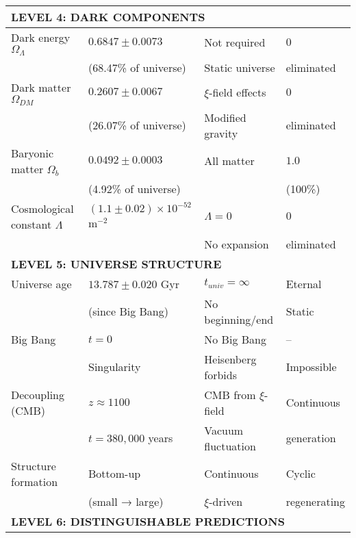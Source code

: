 \documentclass[12pt,a4paper]{article}
\begin{document}
\begin{longtable}{p{5cm}p{4cm}p{3.5cm}p{3.5cm}}
	\midrule
	\multicolumn{4}{l}{\textbf{LEVEL 4: DARK COMPONENTS}} \\
	\midrule
	
	Dark energy $\Omega_\Lambda$ & $0.6847 \pm 0.0073$ & Not required & $0$ \\
	& (68.47\% of universe) & Static universe & eliminated \\[0.3em]
	
	Dark matter $\Omega_{DM}$ & $0.2607 \pm 0.0067$ & $\xi$-field effects & $0$ \\
	& (26.07\% of universe) & Modified gravity & eliminated \\[0.3em]
	
	Baryonic matter $\Omega_b$ & $0.0492 \pm 0.0003$ & All matter & $1.0$ \\
	& (4.92\% of universe) & & (100\%) \\[0.3em]
	
	Cosmological constant $\Lambda$ & $(1.1 \pm 0.02) \times 10^{-52}$ m$^{-2}$ & $\Lambda = 0$ & $0$ \\
	& & No expansion & eliminated \\[0.3em]
	
	\midrule
	\multicolumn{4}{l}{\textbf{LEVEL 5: UNIVERSE STRUCTURE}} \\
	\midrule
	
	Universe age & $13.787 \pm 0.020$ Gyr & $t_{univ} = \infty$ & Eternal \\
	& (since Big Bang) & No beginning/end & Static \\[0.3em]
	
	Big Bang & $t = 0$ & No Big Bang & -- \\
	& Singularity & Heisenberg forbids & Impossible \\[0.3em]
	
	Decoupling (CMB) & $z \approx 1100$ & CMB from $\xi$-field & Continuous \\
	& $t = 380,000$ years & Vacuum fluctuation & generation \\[0.3em]
	
	Structure formation & Bottom-up & Continuous & Cyclic \\
	& (small → large) & $\xi$-driven & regenerating \\[0.3em]
	
	\midrule
	\multicolumn{4}{l}{\textbf{LEVEL 6: DISTINGUISHABLE PREDICTIONS}} \\
	\midrule
	

\end{longtable}
\end{document}
